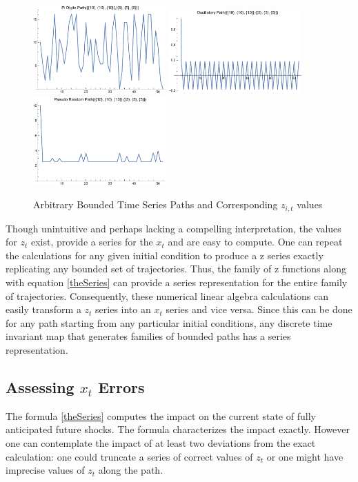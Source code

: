 \documentclass[12pt]{article}
\begin{document}
\begin{figure}
  \centering
\includegraphics[width=2in]{piPath.pdf}
\includegraphics[width=2in]{oscillPath.pdf}
\includegraphics[width=2in]{pseudoPath.pdf}
  
  \caption{Arbitrary Bounded Time Series Paths and Corresponding $z_{i,t}$ values}\label{arbpaths}
\end{figure}





Though unintuitive and perhaps lacking a compelling 
interpretation, the values for
$z_t$ exist,  provide  a series for the $x_t$  and are easy to compute.
One can repeat the calculations for any given initial condition to produce
a z series exactly replicating any bounded set of trajectories.  Thus, the family
of z functions along with equation \ref{theSeries} can provide a series 
representation for the entire family of trajectories. Consequently, these
numerical linear algebra calculations can easily transform a $z_t$ series into an $x_t$ series and vice versa.  Since this can be done for any path starting from any particular initial conditions, 
any discrete time invariant map that generates families of bounded paths has a series representation.





\subsection{Assessing $x_t$ Errors}
\label{sec:truncationerr}
The formula \ref{theSeries} 
computes the impact on the current state of fully anticipated future shocks.  The formula characterizes the impact exactly.  However one can contemplate the impact of at least two deviations from the exact calculation:
one could truncate a series of correct values of $z_t$ or
one might have imprecise values of $z_t$ along the path.
\end{document}

